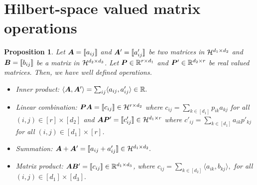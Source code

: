 \documentclass[12pt]{article}
\newtheorem{prop}{Proposition}
\begin{document}
\section{Hilbert-space valued matrix operations}
\begin{prop}
    Let $\bm A = \llbracket a_{ij} \rrbracket$ and $\bm A' = \llbracket a'_{ij} \rrbracket$ be two matrices in $\mathcal{H}^{d_1\times d_2}$ and $\bm B = \llbracket b_{ij} \rrbracket$ be a matrix in $\mathcal{H}^{d_2\times d_3}$.  Let $\bm{P}\in\mathbb{R}^{r\times d_1}$ and $\bm{P}'\in\mathbb{R}^{d_2\times r}$ be real valued matrices. Then, we have well defined operations.
    \begin{itemize}
    \item Inner product: $\langle \bm A,\bm A' \rangle = \sum_{ij}\langle a_{ij},a'_{ij}\rangle\in\mathbb{R}.$
    \item Linear combination: $\bm{P}\bm A = \llbracket c_{ij} \rrbracket\in\mathcal{H}^{r\times d_2}$ where $c_{ij} = \sum_{k\in[d_1]}p_{ik}a_{kj}$ for all $(i,j)\in[r]\times[d_2]$ and  $\bm A\bm{P}' = \llbracket c'_{ij} \rrbracket\in\mathcal{H}^{d_1\times r}$ where $c'_{ij} = \sum_{k\in[d_1]}a_{ik}p'_{kj}$ for all $(i,j)\in[d_1]\times[r]$.
    \item Summation:  $\bm A+\bm A' = \llbracket a_{ij}+a'_{ij} \rrbracket\in\mathcal{H}^{d_1\times d_2}.$
    \item Matrix product: $\bm A\bm B' = \llbracket c_{ij} \rrbracket\in\mathbb{R}^{d_1\times d_3}$, where $c_{ij} = \sum_{k\in[d_2]}\langle a_{ik},b_{kj}\rangle,$ for all $(i,j)\in[d_1]\times[d_3].$ 
\end{itemize}
\end{prop}



\end{document}
